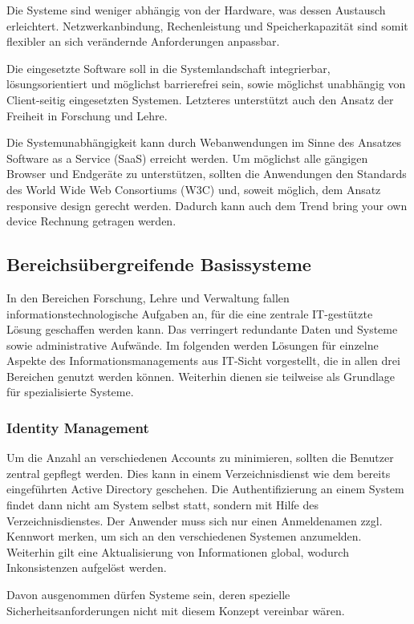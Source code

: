 Die Systeme sind weniger abhängig von der Hardware, was dessen Austausch erleichtert. Netzwerkanbindung, Rechenleistung und Speicherkapazität sind somit flexibler an sich verändernde Anforderungen anpassbar.

Die eingesetzte Software soll in die Systemlandschaft integrierbar, lösungsorientiert und möglichst barrierefrei sein, sowie möglichst unabhängig von Client-seitig eingesetzten Systemen. Letzteres unterstützt auch den Ansatz der Freiheit in Forschung und Lehre.

Die Systemunabhängigkeit kann durch Webanwendungen im Sinne des Ansatzes Software as a Service (SaaS) erreicht werden. Um möglichst alle gängigen Browser und Endgeräte zu unterstützen, sollten die Anwendungen den Standards des World Wide Web Consortiums (W3C) und, soweit möglich, dem Ansatz responsive design gerecht werden. Dadurch kann auch dem Trend bring your own device Rechnung getragen werden.

\subsection{Bereichsübergreifende Basissysteme}
In den Bereichen Forschung, Lehre und Verwaltung fallen informationstechnologische Aufgaben an, für die eine zentrale IT-gestützte Lösung geschaffen werden kann. Das verringert redundante Daten und Systeme sowie administrative Aufwände. Im folgenden werden Lösungen für einzelne Aspekte des Informationsmanagements aus IT-Sicht vorgestellt, die in allen drei Bereichen genutzt werden können. Weiterhin dienen sie teilweise als Grundlage für spezialisierte Systeme.

\subsubsection{Identity Management}
Um die Anzahl an verschiedenen Accounts zu minimieren, sollten die Benutzer zentral gepflegt werden. Dies kann in einem Verzeichnisdienst wie dem bereits eingeführten Active Directory geschehen. Die Authentifizierung an einem System findet dann nicht am System selbst statt, sondern mit Hilfe des Verzeichnisdienstes. Der Anwender muss sich nur einen Anmeldenamen zzgl. Kennwort merken, um sich an den verschiedenen Systemen anzumelden. Weiterhin gilt eine Aktualisierung von Informationen global, wodurch Inkonsistenzen aufgelöst werden.

Davon ausgenommen dürfen Systeme sein, deren spezielle Sicherheitsanforderungen nicht mit diesem Konzept vereinbar wären.

